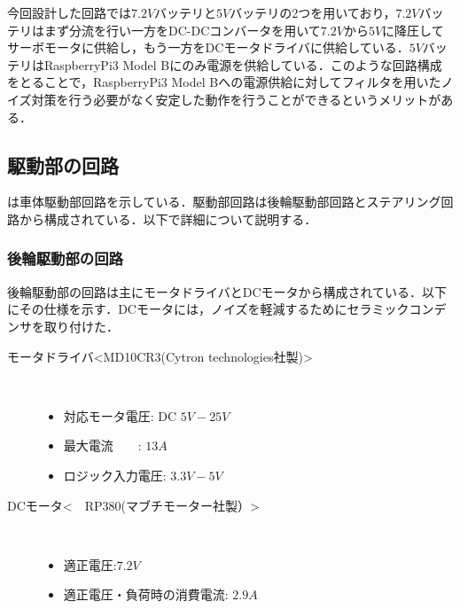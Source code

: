 今回設計した回路では$7.2\unit{V}$バッテリと$5\unit{V}$バッテリの2つを用いており，$7.2\unit{V}$バッテリはまず分流を行い一方をDC-DCコンバータを用いて$7.2\unit{V}$から$5\unit{V}$に降圧してサーボモータに供給し，もう一方をDCモータドライバに供給している．$5\unit{V}$バッテリはRaspberryPi3 Model Bにのみ電源を供給している．このような回路構成をとることで，RaspberryPi3 Model Bへの電源供給に対してフィルタを用いたノイズ対策を行う必要がなく安定した動作を行うことができるというメリットがある\cite{motor}．


\subsection{駆動部の回路}
は車体駆動部回路を示している．駆動部回路は後輪駆動部回路とステアリング回路から構成されている．以下で詳細について説明する．


\subsubsection{後輪駆動部の回路}
後輪駆動部の回路は主にモータドライバとDCモータから構成されている．以下にその仕様を示す．DCモータには，ノイズを軽減するためにセラミックコンデンサを取り付けた\cite{motor}．
\begin{description}
    \item[モータドライバ\textless MD10CR3(Cytron technologies社製)\textgreater \cite{motordriver}]\mbox{}\\
    \vspace{-5mm}
        \begin{itemize}
            \item 対応モータ電圧: DC $5\unit{V}-25\unit{V}$
            \item 最大電流　　: $13\unit{A}$
            \item ロジック入力電圧: $3.3\unit{V}-5\unit{V}$
        \end{itemize}
     \item[DCモータ\textless　RP380(マブチモーター社製）\textgreater\cite{R380}]\mbox{}\\
     \vspace{-5mm}
         \begin{itemize}
            \item 適正電圧:$7.2\unit{V}$
            \item 適正電圧・負荷時の消費電流: $2.9\unit{A}$
        \end{itemize}
\end{description}

